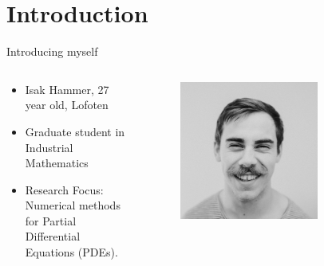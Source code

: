 	\section{Introduction}


    \begin{frame}{Introducing myself}
        \begin{columns}
            \begin{column}{0.5\textwidth}
                \begin{itemize}
                    \item Isak Hammer, 27 year old, Lofoten
                    \item Graduate student in Industrial Mathematics
                    \item Research Focus: Numerical methods for Partial Differential Equations (PDEs).
                \end{itemize}
            \end{column}

            \begin{column}{0.5\textwidth}
                \begin{figure}
                    \centering
                    \includegraphics[width=0.7\textwidth]{figures/isak.jpg}
                \end{figure}
            \end{column}
        \end{columns}
    \end{frame}

